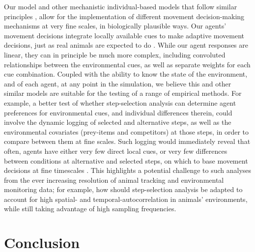     Our model \citep{gupte2021a,netz2022a} and other mechanistic individual-based models that follow similar principles \citep{getz2015,getz2016,netz2021}, allow for the implementation of different movement decision-making mechanisms at very fine scales, in biologically plausible ways.
    Our agents' movement decisions integrate locally available cues to make adaptive movement decisions, just as real animals are expected to do \citep{nathan2008a}.
    While our agent responses are linear, they can in principle be much more complex, including convoluted relationships between the environmental cues, as well as separate weights for each cue combination.
    Coupled with the ability to know the state of the environment, and of each agent, at any point in the simulation, we believe this and other similar models are suitable for the testing of a range of empirical methods.
    For example, a better test of whether step-selection analysis can determine agent preferences for environmental cues, and individual differences therein, could involve the dynamic logging of selected and alternative steps, as well as the environmental covariates (prey-items and competitors) at those steps, in order to compare between them at fine scales.
    Such logging would immediately reveal that often, agents have either very few direct local cues, or very few differences between conditions at alternative and selected steps, on which to base movement decisions at fine timescales \cite[relatively clueless regions, per][]{perkins1992}.
    This highlights a potential challenge to such analyses from the ever increasing resolution of animal tracking and environmental monitoring data; for example, how should step-selection analysis be adapted to account for high spatial- and temporal-autocorrelation in animals' environments, while still taking advantage of high sampling frequencies.
    
    \section*{Conclusion}
    
